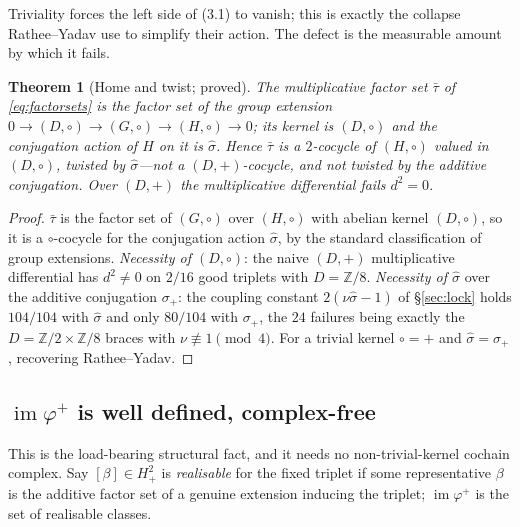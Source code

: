 \documentclass[11pt,reqno]{amsart}
\theoremstyle{plain}
\newtheorem{theorem}{Theorem}[section]
\theoremstyle{definition}
\newcommand{\Z}{\mathbb{Z}}
\newcommand{\im}{\operatorname{im}}
\newcommand{\shat}{\widehat{\sigma}}
\begin{document}
Triviality forces the left side of (3.1) to vanish; this is exactly the collapse
Rathee--Yadav use to simplify their action. The defect is the measurable amount by which it
fails.

\begin{theorem}[Home and twist; proved]\label{thm:home}
The multiplicative factor set $\bar\tau$ of \eqref{eq:factorsets} is the factor set of the
group extension $0\to(D,\circ)\to(G,\circ)\to(H,\circ)\to0$; its kernel is $(D,\circ)$ and
the conjugation action of $H$ on it is $\shat$. Hence $\bar\tau$ is a $2$-cocycle of
$(H,\circ)$ \emph{valued in $(D,\circ)$, twisted by $\shat$}---not a $(D,+)$-cocycle, and
not twisted by the additive conjugation. Over $(D,+)$ the multiplicative differential fails
$d^2=0$.
\end{theorem}
\begin{proof}
$\bar\tau$ is the factor set of $(G,\circ)$ over $(H,\circ)$ with abelian kernel
$(D,\circ)$, so it is a $\circ$-cocycle for the conjugation action $\shat$, by the standard
classification of group extensions. \emph{Necessity of $(D,\circ)$}: the naive $(D,+)$
multiplicative differential has $d^2\ne0$ on $2/16$ good triplets with $D=\Z/8$.
\emph{Necessity of $\shat$} over the additive conjugation $\sigma_+$: the coupling constant
$2(\nu\shat-1)$ of \S\ref{sec:lock} holds $104/104$ with $\shat$ and only $80/104$ with
$\sigma_+$, the $24$ failures being exactly the $D=\Z/2\times\Z/8$ braces with
$\nu\not\equiv1\pmod4$. For a trivial kernel $\circ=+$ and $\shat=\sigma_+$, recovering
Rathee--Yadav.
\end{proof}

\subsection{$\im\varphi^{+}$ is well defined, complex-free}
This is the load-bearing structural fact, and it needs no non-trivial-kernel cochain
complex. Say $[\beta]\in H^2_+$ is \emph{realisable} for the fixed triplet if some
representative $\beta$ is the additive factor set of a genuine extension inducing the
triplet; $\im\varphi^{+}$ is the set of realisable classes.
\end{document}
